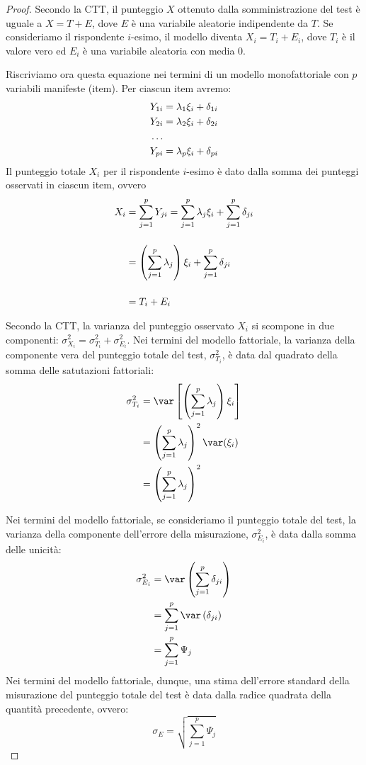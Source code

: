 \begin{proof}
Secondo la CTT, il punteggio $X$ ottenuto dalla somministrazione del test è uguale a $X = T + E$, dove $E$ è una variabile aleatorie indipendente da $T$.
Se consideriamo il rispondente $i$-esimo, il modello diventa
$
X_i = T_i + E_i
$, 
dove $T_i$ è il valore vero ed $E_i$ è una variabile aleatoria con media 0.

Riscriviamo ora questa equazione nei termini di un modello monofattoriale con $p$ variabili manifeste (item). Per ciascun item avremo:
\begin{align}
 Y_{1i} &=  \lambda_1 \xi_i + \delta_{1i} \notag\\
 Y_{2i} &=  \lambda_2 \xi_i + \delta_{2i} \notag\\
  \dots\notag\\
 Y_{pi} &=  \lambda_p \xi_i + \delta_{pi} \notag
\end{align}
Il punteggio totale $X_i$ per il rispondente $i$-esimo è dato dalla somma dei punteggi osservati in ciascun item, ovvero 
\begin{align}
 X_i &= \sum_{j=1}^p Y_{ji} = \sum_{j=1}^p \lambda_j \xi_i + \sum_{j=1}^p \delta_{ji}\notag\\[12pt]
  &=  \left( \sum_{j=1}^p \lambda_j \right) \xi_i  +  \sum_{j=1}^p \delta_{ji} \notag\\[12pt]
  &= T_i + E_i\notag
  \end{align}

Secondo la CTT, la varianza del punteggio osservato $X_i$ si scompone in due componenti:
$
\sigma^2_{X_i} = \sigma^2_{T_i} + \sigma^2_{E_i}
$.
Nei termini del modello fattoriale, la varianza della componente vera del punteggio totale del test, $\sigma^2_{T_i}$, è data dal quadrato della somma delle satutazioni fattoriali:
\begin{align}
 \sigma^2_{T_i} &= \var\left[ \left( \sum_{j=1}^p \lambda_j \right) \xi_i \right]\notag\\
 &= \left( \sum_{j=1}^p \lambda_j \right)^2 \var(\xi_i)\notag\\
 &= \left( \sum_{j=1}^p \lambda_j \right)^2 \notag
\end{align}

Nei termini del modello fattoriale, se consideriamo il punteggio totale del test,  la varianza della componente dell'errore della misurazione, $\sigma^2_{E_i}$, è data dalla somma delle unicità:
\begin{align}
 \sigma^2_{E_i} &= \var\left( \sum_{j=1}^p \delta_{ji} \right)\notag\\
 &= \sum_{j=1}^p \var\left( \delta_{ji} \right)\notag\\
 &= \sum_{j=1}^p \Psi_j\notag
\end{align}
Nei termini del modello fattoriale, dunque, una stima dell'errore standard della misurazione del punteggio totale del test è  data dalla radice quadrata della quantità precedente, ovvero:
\begin{equation}
 \sigma_{E} = \sqrt{\sum_{j=1}^p \Psi_j}
 \label{eq:err_stnd_meas_FA}
\end{equation}

\end{proof}

